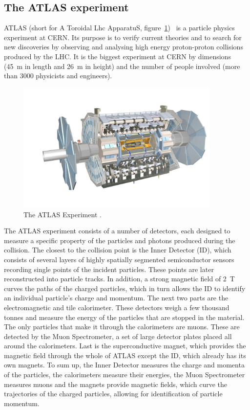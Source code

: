 \subsection{The ATLAS experiment}
ATLAS (short for A Toroidal Lhc ApparatuS, figure~\ref{fig:atlas})~\cite{} is a particle physics experiment at CERN. Its purpose is to verify current theories and to search for new discoveries by observing and analysing high energy proton-proton collisions produced by the LHC. It is the biggest experiment at CERN by dimensions (45~m in length and 26~m in height) and the number of people involved (more than 3000 physicists and engineers).
\begin{figure}[!t]
\centering
\includegraphics[width=0.9\textwidth]{01_introduction/pics/atlas3}
\caption{The ATLAS Experiment \cite{Pequenao:1095924}.}
\label{fig:atlas}
\end{figure}
The ATLAS experiment consists of a number of detectors, each designed to measure a specific property of the particles and photons produced during the collision. The closest to the collision point is the Inner Detector (ID), which consists of several layers of highly spatially segmented semiconductor sensors recording single points of the incident particles. These points are later reconstructed into particle tracks. In addition, a strong magnetic field of 2~T curves the paths of the charged particles, which in turn allows the ID to identify an individual particle's charge and momentum. The next two parts are the electromagnetic and tile calorimeter. These detectors weigh a few thousand tonnes and measure the energy of the particles that are stopped in the material. The only particles that make it through the calorimeters are muons. These are detected by the Muon Spectrometer, a set of large detector plates placed all around the calorimeters. Last is the superconductive magnet, which provides the magnetic field through the whole of ATLAS except the ID, which already has its own magnets. To sum up, the Inner Detector measures the charge and momenta of the particles, the calorimeters measure their energies, the Muon Spectrometer measures muons and the magnets provide magnetic fields, which curve the trajectories of the charged particles, allowing for identification of particle momentum.


